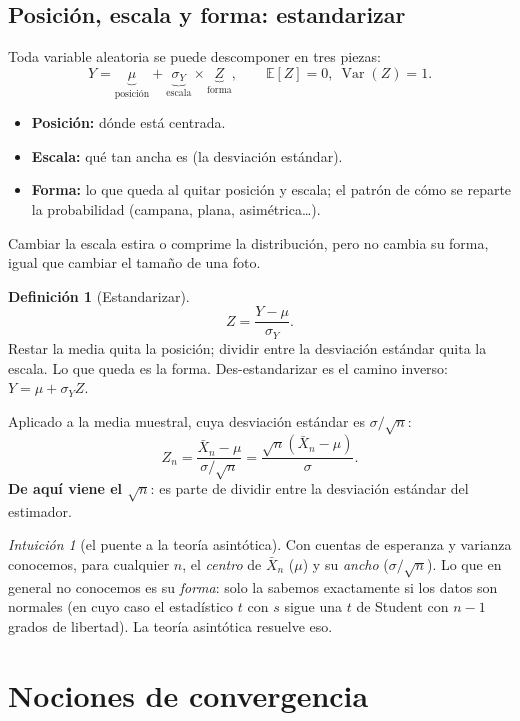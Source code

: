 \documentclass[11pt,a4paper]{article}
\theoremstyle{plain}
\theoremstyle{definition}
\newtheorem{definicion}[teorema]{Definición}
\theoremstyle{remark}
\newtheorem*{intuicion}{Intuición}
\newcommand{\E}{\mathbb{E}}
\DeclareMathOperator{\Var}{Var}
\begin{document}
\subsection{Posición, escala y forma: estandarizar}\label{sec:estandarizar}

Toda variable aleatoria se puede descomponer en tres piezas:
\[
Y=\underbrace{\mu}_{\text{posición}}+\underbrace{\sigma_Y}_{\text{escala}}\times
\underbrace{Z}_{\text{forma}},\qquad \E[Z]=0,\ \Var(Z)=1 .
\]
\begin{itemize}
  \item \textbf{Posición:} dónde está centrada.
  \item \textbf{Escala:} qué tan ancha es (la desviación estándar).
  \item \textbf{Forma:} lo que queda al quitar posición y escala; el patrón de cómo se reparte
        la probabilidad (campana, plana, asimétrica\ldots).
\end{itemize}
Cambiar la escala estira o comprime la distribución, pero no cambia su forma, igual que
cambiar el tamaño de una foto.

\begin{definicion}[Estandarizar]\label{def:estand}
\[
Z=\frac{Y-\mu}{\sigma_Y}.
\]
Restar la media quita la posición; dividir entre la desviación estándar quita la escala. Lo
que queda es la forma. Des-estandarizar es el camino inverso: $Y=\mu+\sigma_YZ$.
\end{definicion}

Aplicado a la media muestral, cuya desviación estándar es $\sigma/\sqrt n$:
\[
Z_n=\frac{\bar X_n-\mu}{\sigma/\sqrt n}=\frac{\sqrt n(\bar X_n-\mu)}{\sigma}.
\]
\textbf{De aquí viene el $\sqrt n$}: es parte de dividir entre la desviación estándar del
estimador.

\begin{intuicion}[el puente a la teoría asintótica]
Con cuentas de esperanza y varianza conocemos, para cualquier $n$, el \emph{centro} de
$\bar X_n$ ($\mu$) y su \emph{ancho} ($\sigma/\sqrt n$). Lo que en general no conocemos es su
\emph{forma}: solo la sabemos exactamente si los datos son normales (en cuyo caso el
estadístico $t$ con $s$ sigue una $t$ de Student con $n-1$ grados de libertad). La teoría
asintótica resuelve eso.
\end{intuicion}

\section{Nociones de convergencia}\label{sec:conv}
\end{document}
